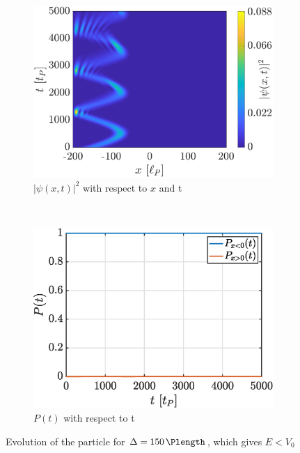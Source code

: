 \documentclass[a4paper,12pt,twoside]{article}
\begin{document}
    \begin{figure}[h]
      \centering
      \begin{subfigure}[t]{0.45\textwidth}
        \includegraphics[width=\textwidth]{graphs/iii_evo_Eleqv0_evo.eps}
        \caption{$|\psi(x, t)|^2$ with respect to $x$ and t}
        \label{fig:iii_evo_Eleqv0_evo}
      \end{subfigure}
      ~
      \begin{subfigure}[t]{0.45\textwidth}
        \includegraphics[width=\textwidth]{graphs/iii_evo_Eleqv0_prob.eps}
        \caption{$P(t)$ with respect to t}
        \label{fig:iii_evo_Eleqv0_prob}
      \end{subfigure}
      \caption{Evolution of the particle for $\Delta = \SI{150}{\Plength}$, which gives $E < V_0$}
      \label{fig:iii_evo_Eleqv0}
    \end{figure}
\end{document}
